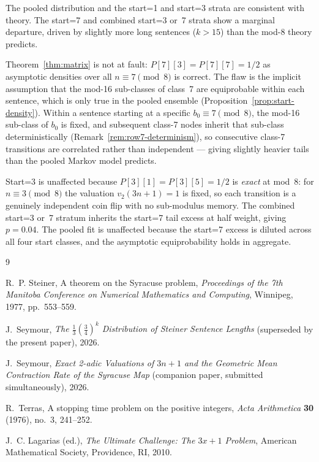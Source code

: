 \documentclass[12pt]{article}
\theoremstyle{definition}
\theoremstyle{remark}
\begin{document}
The pooled distribution and the start=1 and start=3 strata are consistent
with theory.
The start=7 and combined start=3 or~7 strata show a marginal departure,
driven by slightly more long sentences ($k>15$) than the mod-8 theory predicts.

Theorem~\ref{thm:matrix} is not at fault: $P[7][3]=P[7][7]=1/2$ as asymptotic
densities over all $n\equiv 7\pmod 8$ is correct.
The flaw is the implicit assumption that the mod-16 sub-classes of class~7
are equiprobable within each sentence, which is only true in the pooled
ensemble (Proposition~\ref{prop:start-density}).
Within a sentence starting at a specific $b_0\equiv 7\pmod 8$, the mod-16
sub-class of $b_0$ is fixed, and subsequent class-7 nodes inherit that
sub-class deterministically (Remark~\ref{rem:row7-determinism}), so
consecutive class-7 transitions are correlated rather than independent —
giving slightly heavier tails than the pooled Markov model predicts.

Start=3 is unaffected because $P[3][1]=P[3][5]=1/2$ is \emph{exact} at mod~8:
for $n\equiv 3\pmod 8$ the valuation $v_2(3n+1)=1$ is fixed, so each
transition is a genuinely independent coin flip with no sub-modulus memory.
The combined start=3 or~7 stratum inherits the start=7 tail excess at half
weight, giving $p=0.04$.
The pooled fit is unaffected because the start=7 excess is diluted across
all four start classes, and the asymptotic equiprobability holds in aggregate.

\clearpage
\begin{thebibliography}{9}

R.~P. Steiner,
A theorem on the Syracuse problem,
\emph{Proceedings of the 7th Manitoba Conference on Numerical Mathematics
and Computing}, Winnipeg, 1977, pp.~553--559.

J.~Seymour,
\emph{The $\frac{1}{3}(\frac{3}{4})^k$ Distribution of Steiner Sentence Lengths}
(superseded by the present paper),
2026.

J.~Seymour,
\emph{Exact 2-adic Valuations of $3n+1$ and the Geometric Mean Contraction Rate
of the Syracuse Map}
(companion paper, submitted simultaneously),
2026.

R.~Terras,
A stopping time problem on the positive integers,
\emph{Acta Arithmetica} \textbf{30} (1976), no.~3, 241--252.

J.~C. Lagarias (ed.),
\emph{The Ultimate Challenge: The $3x+1$ Problem},
American Mathematical Society, Providence, RI, 2010.

\end{thebibliography}
\end{document}
